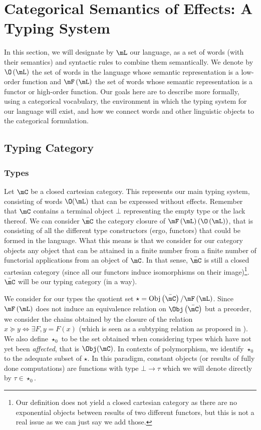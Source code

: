 \section{Categorical Semantics of Effects: A Typing System}
\label{sec:typingsystem}
In this section, we will designate by $\mL$ our language, as a set of words
(with their semantics) and syntactic rules to combine them semantically.
We denote by $\O\left( \mL \right)$ the set of words in the language whose
semantic representation is a low-order function and $\mF\left( \mL \right)$ the
set of words whose semantic representation is a functor or high-order function.
Our goals here are to describe more formally, using a categorical vocabulary,
the environment in which the typing system for our language will exist, and how
we connect words and other linguistic objects to the categorical formulation.

\subsection{Typing Category}\label{subsec:typingcategory}
\subsubsection{Types}\label{subsubsec:types}
Let $\mC$ be a closed cartesian category.
This represents our main typing system, consisting of words $\O(\mL)$ that can
be expressed without effects.
Remember that $\mC$ contains a terminal object $\bot$ representing the empty
type or the lack thereof.
We can consider $\bar{\mC}$ the category closure of
$\mF\left( \mL \right)\left(\O\left( \mL \right)\right)$, that is consisting of
all the different type constructors (ergo, functors) that could be formed in
the language.
What this means is that we consider for our category objects any object that
can be attained in a finite number from a finite number of functorial
applications from an object of $\mC$.
In that sense, $\bar{\mC}$ is still a closed cartesian category (since all our
functors induce isomorphisms on their image)\footnote{Our definition does not
	yield a closed cartesian category as there are no exponential objects between
	results of two different functors, but this is not a real issue as we can just
	say we add those.}.
$\bar{\mC}$ will be our typing category (in a way).

We consider for our types the quotient set
$\star = \mathrm{Obj}\left( \bar{\mC} \right)/\mF\left( \mL \right)$.
Since $\mF\left( \mL \right)$ does not induce an equivalence relation on
$\Obj\left( \bar{\mC} \right)$ but a preorder, we consider the chains obtained
by the closure of the relation $x\succeq y \Leftrightarrow \exists F, y = F(x)$
(which is seen as a subtyping relation as proposed in
).
We also define $\star_{0}$ to be the set obtained when considering types which
have not yet been \emph{affected}, that is $\Obj(\mC)$.
In contexts of polymorphism, we identify $\star_{0}$ to the adequate subset of
$\star$.
In this paradigm, constant objects (or results of fully done computations) are
functions with type $\bot \to \tau$ which we will denote directly by
$\tau \in \star_{0}$.

